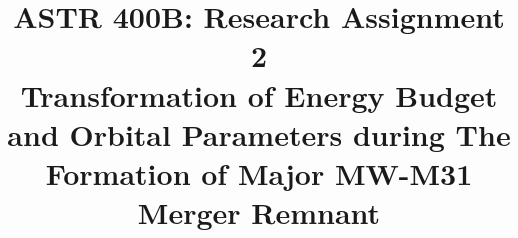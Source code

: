 \documentclass[twocolumn]{aastex631}
\begin{document}
\title{ASTR 400B: Research Assignment 2 \\ Transformation of Energy Budget and Orbital Parameters during The Formation of Major MW-M31 Merger Remnant}


\end{document}
